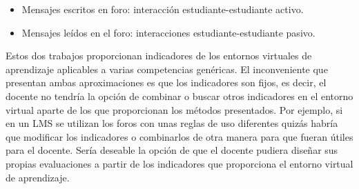 \begin{itemize}
\item Mensajes escritos en foro: interacción estudiante-estudiante activo.
\item Mensajes leídos en el foro:  interacciones estudiante-estudiante pasivo.
\end{itemize}

Estos dos trabajos proporcionan indicadores de los entornos virtuales de aprendizaje aplicables a varias competencias genéricas. El inconveniente que presentan ambas aproximaciones es que los indicadores son fijos, es decir, el docente no tendría la opción de combinar o buscar otros indicadores en el entorno virtual aparte de los que proporcionan los métodos presentados. Por ejemplo, si en un LMS se utilizan los foros con unas reglas de uso diferentes quizás habría que modificar los indicadores o combinarlos de otra manera para que fueran útiles para el docente. Sería deseable la opción de que el docente pudiera diseñar sus propias evaluaciones a partir de los indicadores que proporciona el entorno virtual de aprendizaje.

